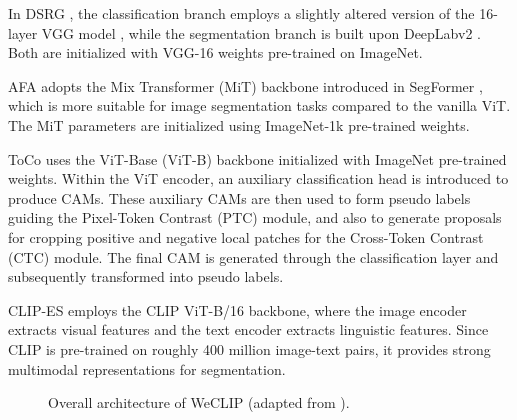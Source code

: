 In DSRG \cite{wsss_dsrg_deep_seeded_region_growing}, the classification branch employs a slightly altered version of the 16-layer VGG model \cite{VGG16}, while the segmentation branch is built upon DeepLabv2 \cite{fsss_deeplabv2}. Both are initialized with VGG-16 weights pre-trained on ImageNet.

AFA \cite{wsss_afa_affinity_from_attention} adopts the Mix Transformer (MiT) backbone introduced in SegFormer \cite{fsss_segformer}, which is more suitable for image segmentation tasks compared to the vanilla ViT. The MiT parameters are initialized using ImageNet-1k pre-trained weights.

ToCo \cite{wsss_toco_token_contrast} uses the ViT-Base (ViT-B) backbone initialized with ImageNet pre-trained weights. Within the ViT encoder, an auxiliary classification head is introduced to produce CAMs. These auxiliary CAMs are then used to form pseudo labels guiding the Pixel-Token Contrast (PTC) module, and also to generate proposals for cropping positive and negative local patches for the Cross-Token Contrast (CTC) module. The final CAM is generated through the classification layer and subsequently transformed into pseudo labels.

CLIP-ES \cite{wsss_clip_es} employs the CLIP ViT-B/16 backbone, where the image encoder extracts visual features and the text encoder extracts linguistic features. Since CLIP is pre-trained on roughly 400 million image-text pairs, it provides strong multimodal representations for segmentation.

\begin{figure}[htbp]
    \centering
    \caption{Overall architecture of WeCLIP (adapted from \cite{wsss_frozen_clip}).}
    \label{fig:frozenclip}
\end{figure}

